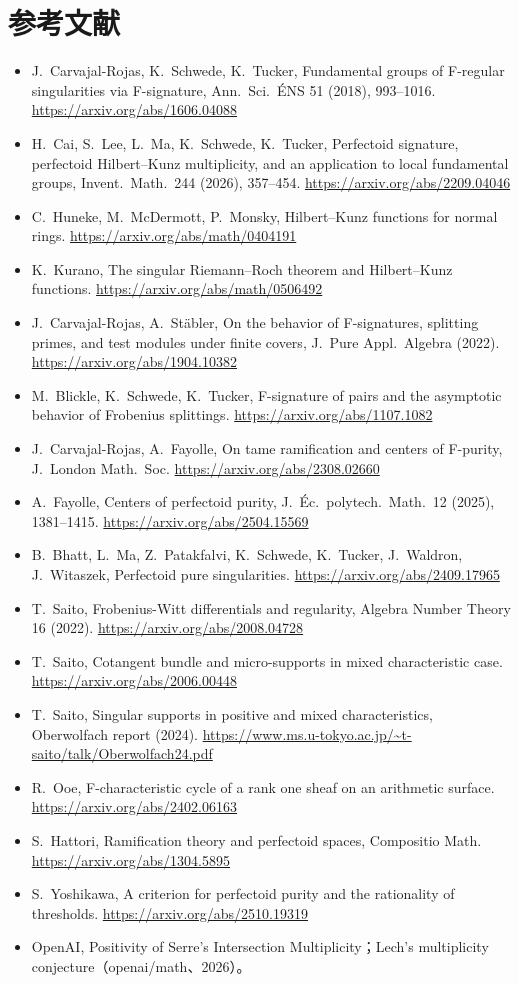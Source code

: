\documentclass[11pt,a4paper]{ltjsarticle}
\theoremstyle{plain}
\theoremstyle{definition}
\theoremstyle{remark}
\theoremstyle{plain}
\begin{document}
\section*{参考文献}
\begin{itemize}
  \item J.~Carvajal-Rojas, K.~Schwede, K.~Tucker, Fundamental groups of F-regular singularities via F-signature, Ann.\ Sci.\ ÉNS 51 (2018), 993--1016. \url{https://arxiv.org/abs/1606.04088}
  \item H.~Cai, S.~Lee, L.~Ma, K.~Schwede, K.~Tucker, Perfectoid signature, perfectoid Hilbert--Kunz multiplicity, and an application to local fundamental groups, Invent.\ Math.\ 244 (2026), 357--454. \url{https://arxiv.org/abs/2209.04046}
  \item C.~Huneke, M.~McDermott, P.~Monsky, Hilbert--Kunz functions for normal rings. \url{https://arxiv.org/abs/math/0404191}
  \item K.~Kurano, The singular Riemann--Roch theorem and Hilbert--Kunz functions. \url{https://arxiv.org/abs/math/0506492}
  \item J.~Carvajal-Rojas, A.~Stäbler, On the behavior of F-signatures, splitting primes, and test modules under finite covers, J.\ Pure Appl.\ Algebra (2022). \url{https://arxiv.org/abs/1904.10382}
  \item M.~Blickle, K.~Schwede, K.~Tucker, F-signature of pairs and the asymptotic behavior of Frobenius splittings. \url{https://arxiv.org/abs/1107.1082}
  \item J.~Carvajal-Rojas, A.~Fayolle, On tame ramification and centers of F-purity, J.\ London Math.\ Soc. \url{https://arxiv.org/abs/2308.02660}
  \item A.~Fayolle, Centers of perfectoid purity, J.\ Éc.\ polytech.\ Math.\ 12 (2025), 1381--1415. \url{https://arxiv.org/abs/2504.15569}
  \item B.~Bhatt, L.~Ma, Z.~Patakfalvi, K.~Schwede, K.~Tucker, J.~Waldron, J.~Witaszek, Perfectoid pure singularities. \url{https://arxiv.org/abs/2409.17965}
  \item T.~Saito, Frobenius-Witt differentials and regularity, Algebra Number Theory 16 (2022). \url{https://arxiv.org/abs/2008.04728}
  \item T.~Saito, Cotangent bundle and micro-supports in mixed characteristic case. \url{https://arxiv.org/abs/2006.00448}
  \item T.~Saito, Singular supports in positive and mixed characteristics, Oberwolfach report (2024). \url{https://www.ms.u-tokyo.ac.jp/~t-saito/talk/Oberwolfach24.pdf}
  \item R.~Ooe, F-characteristic cycle of a rank one sheaf on an arithmetic surface. \url{https://arxiv.org/abs/2402.06163}
  \item S.~Hattori, Ramification theory and perfectoid spaces, Compositio Math. \url{https://arxiv.org/abs/1304.5895}
  \item S.~Yoshikawa, A criterion for perfectoid purity and the rationality of thresholds. \url{https://arxiv.org/abs/2510.19319}
  \item OpenAI, Positivity of Serre's Intersection Multiplicity；Lech's multiplicity conjecture（openai/math、2026）。
\end{itemize}
\end{document}
